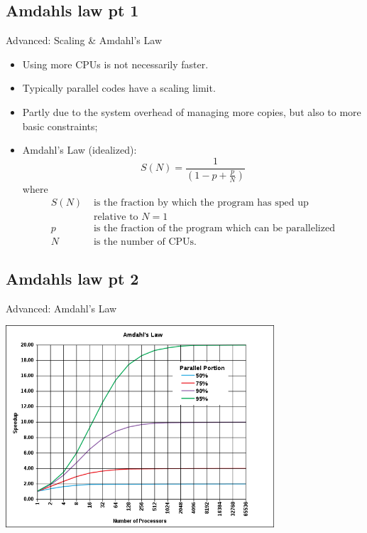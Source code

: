 \subsection{Amdahls law pt 1}
\begin{frame}{Advanced: Scaling \& Amdahl's Law}
\begin{itemize}
\item{\alert{Using more CPUs is not necessarily faster.}}
  \pause
\item{Typically parallel codes have a \alert{scaling limit}.}
\item{Partly due to the system overhead of managing more copies, but also to more basic constraints;}
\pause
\item{Amdahl's Law (idealized):}
\[
S(N)=\frac{1}{\left(1-p+\frac{p}{N}\right)}
\]
where \begin{align*}S(N)&\text{ is the fraction by which the program has sped up}\\&\text{ relative to $N=1$}\\
p&\text{ is the fraction of the program which can be parallelized}\\
N&\text{ is the number of CPUs.}
\end{align*}
\end{itemize}
\end{frame}

\subsection{Amdahls law pt 2}
\begin{frame}{Advanced: Amdahl's Law}
\centerline{\includegraphics[width=0.75\textwidth]{imgs/AmdahlsLaw.png}}%
\smallskip
\end{frame}

